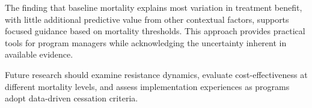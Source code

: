\documentclass[11pt]{article}\usepackage[]{graphicx}\usepackage[]{xcolor}
\begin{document}
The finding that baseline mortality explains most variation in treatment benefit, with little additional predictive value from other contextual factors, supports focused guidance based on mortality thresholds. This approach provides practical tools for program managers while acknowledging the uncertainty inherent in available evidence.

Future research should examine resistance dynamics, evaluate cost-effectiveness at different mortality levels, and assess implementation experiences as programs adopt data-driven cessation criteria.


\clearpage


\end{document}
